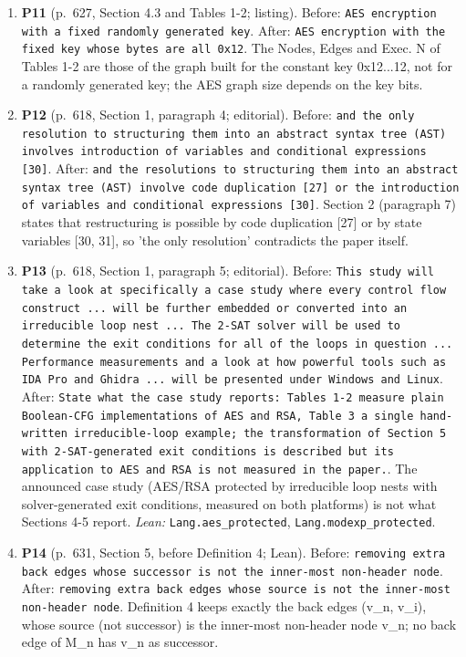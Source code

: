 \documentclass[9pt,twocolumn]{article}
\begin{document}
\begin{enumerate}[label=]
\item \textbf{P11} (p.~627, Section 4.3 and Tables 1-2; listing). Before: \texttt{AES encryption with a fixed randomly generated key}. After: \texttt{AES encryption with the fixed key whose bytes are all 0x12}. The Nodes, Edges and Exec. N of Tables 1-2 are those of the graph built for the constant key 0x12...12, not for a randomly generated key; the AES graph size depends on the key bits. 
\item \textbf{P12} (p.~618, Section 1, paragraph 4; editorial). Before: \texttt{and the only resolution to structuring them into an abstract syntax tree (AST) involves introduction of variables and conditional expressions [30]}. After: \texttt{and the resolutions to structuring them into an abstract syntax tree (AST) involve code duplication [27] or the introduction of variables and conditional expressions [30]}. Section 2 (paragraph 7) states that restructuring is possible by code duplication [27] or by state variables [30, 31], so 'the only resolution' contradicts the paper itself. 
\item \textbf{P13} (p.~618, Section 1, paragraph 5; editorial). Before: \texttt{This study will take a look at specifically a case study where every control flow construct ... will be further embedded or converted into an irreducible loop nest ... The 2-SAT solver will be used to determine the exit conditions for all of the loops in question ... Performance measurements and a look at how powerful tools such as IDA Pro and Ghidra ... will be presented under Windows and Linux}. After: \texttt{State what the case study reports: Tables 1-2 measure plain Boolean-CFG implementations of AES and RSA, Table 3 a single hand-written irreducible-loop example; the transformation of Section 5 with 2-SAT-generated exit conditions is described but its application to AES and RSA is not measured in the paper.}. The announced case study (AES/RSA protected by irreducible loop nests with solver-generated exit conditions, measured on both platforms) is not what Sections 4-5 report. \emph{Lean:} \texttt{Lang.aes\_protected}, \texttt{Lang.modexp\_protected}. 
\item \textbf{P14} (p.~631, Section 5, before Definition 4; Lean). Before: \texttt{removing extra back edges whose successor is not the inner-most non-header node}. After: \texttt{removing extra back edges whose source is not the inner-most non-header node}. Definition 4 keeps exactly the back edges (v\_n, v\_i), whose source (not successor) is the inner-most non-header node v\_n; no back edge of M\_n has v\_n as successor. 

\end{enumerate}
\end{document}
